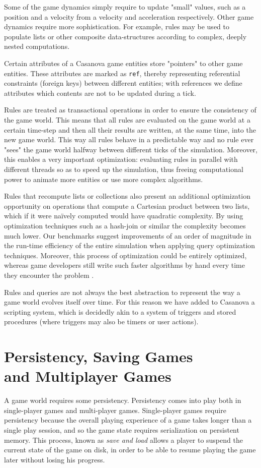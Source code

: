 Some of the game dynamics simply require to update "small" values, such as a position and a velocity from a velocity and acceleration respectively. Other game dynamics require more sophistication. For example, rules may be used to populate lists or other composite data-structures according to complex, deeply nested computations.

Certain attributes of a Casanova game entities store "pointers" to other game entities. These attributes are marked as \texttt{ref}, thereby representing referential constraints (foreign keys) \cite{DATABASE_SYSTEM_IMPLEMENTATION} between different entities; with references we define attributes which contents are not to be updated during a tick.

Rules are treated as transactional operations \cite{APPENDIX_D_11} in order to ensure the consistency of the game world. This means that all rules are evaluated on the game world at a certain time-step and then all their results are written, at the same time, into the new game world. This way all rules behave in a predictable way and no rule ever "sees" the game world halfway between different ticks of the simulation. Moreover, this enables a very important optimization: evaluating rules in parallel with different threads so as to speed up the simulation, thus freeing computational power to animate more entities or use more complex algorithms.

Rules that recompute lists or collections also present an additional optimization opportunity on operations that compute a Cartesian product between two lists, which if it were naïvely computed would have quadratic complexity. By using optimization techniques such as a hash-join or similar the complexity becomes much lower. Our benchmarks \cite{APPENDIX_D_7} suggest improvements of an order of magnitude in the run-time efficiency of the entire simulation when applying query optimization techniques. Moreover, this process of optimization could be entirely optimized, whereas game developers still write such faster algorithms by hand every time they encounter the problem \cite{APPENDIX_D_HANDMADE_OPTIMIZATION_IN_GAMES}.

Rules and queries are not always the best abstraction to represent the way a game world evolves itself over time. For this reason we have added to Casanova a scripting system, which is decidedly akin to a system of triggers and stored procedures (where triggers may also be timers or user actions).


\section{Persistency, Saving Games \\ and Multiplayer Games}
A game world requires some persistency. Persistency comes into play both in single-player games and multi-player games. Single-player games require persistency because the overall playing experience of a game takes longer than a single play session, and so the game state requires serialization on persistent memory. This process, known as \textit{save and load} allows a player to suspend the current state of the game on disk, in order to be able to resume playing the game later without losing his progress.

